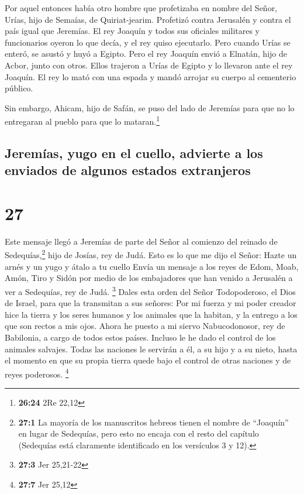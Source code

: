  Por aquel entonces había otro hombre que profetizaba en
nombre del Señor, Urías, hijo de Semaías, de Quiriat-jearim. Profetizó
contra Jerusalén y contra el país igual que Jeremías.  El
rey Joaquín y todos sus oficiales militares y funcionarios oyeron lo que
decía, y el rey quiso ejecutarlo. Pero cuando Urías se enteró, se asustó
y huyó a Egipto.  Pero el rey Joaquín envió a Elnatán,
hijo de Acbor, junto con otros.  Ellos trajeron a Urías
de Egipto y lo llevaron ante el rey Joaquín. El rey lo mató con una
espada y mandó arrojar su cuerpo al cementerio público.

 Sin embargo, Ahicam, hijo de Safán, se puso del lado de
Jeremías para que no lo entregaran al pueblo para que lo
mataran.\footnote{\textbf{26:24} 2Re 22,12}

\hypertarget{jeremuxedas-yugo-en-el-cuello-advierte-a-los-enviados-de-algunos-estados-extranjeros}{%
\subsection{Jeremías, yugo en el cuello, advierte a los enviados de
algunos estados
extranjeros}\label{jeremuxedas-yugo-en-el-cuello-advierte-a-los-enviados-de-algunos-estados-extranjeros}}

\hypertarget{section-26}{%
\section{27}\label{section-26}}

 Este mensaje llegó a Jeremías de parte del Señor al
comienzo del reinado de Sedequías,\footnote{\textbf{27:1} La mayoría de
  los manuscritos hebreos tienen el nombre de ``Joaquín'' en lugar de
  Sedequías, pero esto no encaja con el resto del capítulo (Sedequías
  está claramente identificado en los versículos 3 y 12).} hijo de
Josías, rey de Judá.  Esto es lo que me dijo el Señor:
Hazte un arnés y un yugo y átalo a tu cuello  Envía un
mensaje a los reyes de Edom, Moab, Amón, Tiro y Sidón por medio de los
embajadores que han venido a Jerusalén a ver a Sedequías, rey de Judá.
\footnote{\textbf{27:3} Jer 25,21-22}  Dales esta orden
del Señor Todopoderoso, el Dios de Israel, para que la transmitan a sus
señores:  Por mi fuerza y mi poder creador hice la tierra
y los seres humanos y los animales que la habitan, y la entrego a los
que son rectos a mis ojos.  Ahora he puesto a mi siervo
Nabucodonosor, rey de Babilonia, a cargo de todos estos países. Incluso
le he dado el control de los animales salvajes.  Todas las
naciones le servirán a él, a su hijo y a su nieto, hasta el momento en
que su propia tierra quede bajo el control de otras naciones y de reyes
poderosos. \footnote{\textbf{27:7} Jer 25,12}

